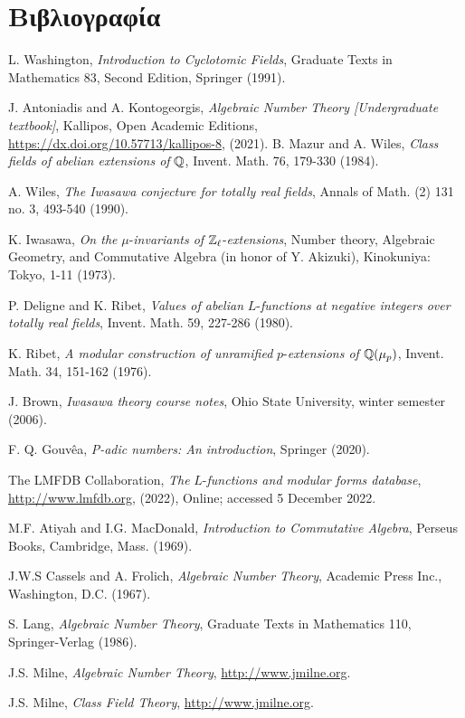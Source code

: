 \documentclass{report}
\begin{document}
\chapter{Βιβλιογραφία}
\vspace*{0.5cm}
\begingroup
{}
\renewcommand{\chapter}[2]{}%
\begin{thebibliography}{}

	 L. Washington, {\em Introduction to Cyclotomic Fields}, Graduate Texts in Mathematics 83, Second Edition, Springer (1991).

	  J. Antoniadis and A. Kontogeorgis, {\em Algebraic Νumber Τheory [Undergraduate textbook]}, Kallipos, Open Academic Editions, \url{https://dx.doi.org/10.57713/kallipos-8},  (2021).
	 B. Mazur and A. Wiles, {\em Class fields of abelian extensions of} $\mathbb{Q}$, Invent. Math. 76, 179-330 (1984).

	 A. Wiles, {\em The Iwasawa conjecture for totally real fields}, Annals of Math. (2) 131 no. 3, 493-540 (1990).

	 K. Iwasawa, {\em On the }$\mu$-{\em invariants of} $\mathbb{Z}_\ell$-{\em extensions}, Number theory, Algebraic Geometry, and Commutative Algebra (in honor of Y. Akizuki), Kinokuniya: Tokyo, 1-11 (1973).
	
	 P. Deligne and K. Ribet, {\em Values of abelian} $L$-{\em functions at negative integers over totally real fields}, Invent. Math. 59, 227-286 (1980).
	
	 K. Ribet, {\em A modular construction of unramified }$p$-{\em extensions of }$\mathbb{Q}(\mu_p)$, Invent. Math. 34, 151-162 (1976).

	 J. Brown, {\em Iwasawa theory course notes}, Ohio State University, winter semester (2006).

	 F. Q. Gouvêa, {\em P-adic numbers: An introduction}, Springer (2020). 

	 The LMFDB Collaboration, {\em The }$L$-{\em functions and modular forms database}, \url{http://www.lmfdb.org}, (2022), Online; accessed 5 December 2022.

	 M.F. Atiyah and I.G. MacDonald, {\em Introduction to Commutative Algebra}, Perseus Books, Cambridge, Mass. (1969).

	 J.W.S Cassels and A. Frolich, {\em Algebraic Number Theory}, Academic Press Inc., Washington, D.C. (1967).

	 S. Lang, {\em Algebraic Number Theory}, Graduate Texts in Mathematics 110, Springer-Verlag (1986).

	 J.S. Milne, {\em Algebraic Number Theory}, \url{http://www.jmilne.org}.

	 J.S. Milne, {\em Class Field Theory}, \url{http://www.jmilne.org}.
\end{thebibliography}
\endgroup
\end{document}
